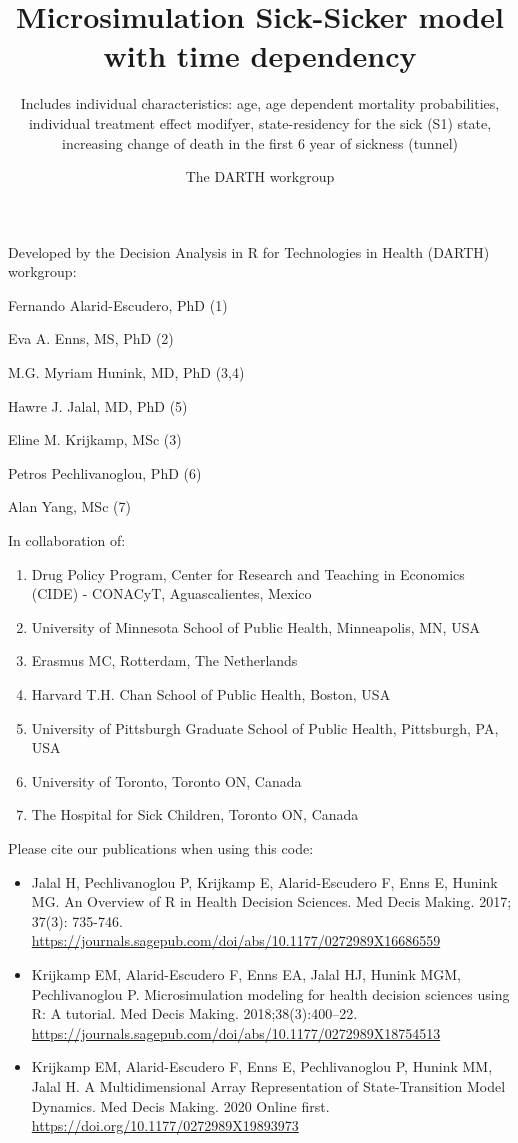 \documentclass[
]{article}
\title{Microsimulation Sick-Sicker model with time dependency}
\subtitle{Includes individual characteristics: age, age dependent mortality
probabilities, individual treatment effect modifyer, state-residency for
the sick (S1) state, increasing change of death in the first 6 year of
sickness (tunnel)}
\author{The DARTH workgroup}
\date{}
\providecommand{\tightlist}{%
  \setlength{\itemsep}{0pt}\setlength{\parskip}{0pt}}
\begin{document}
\maketitle

Developed by the Decision Analysis in R for Technologies in Health
(DARTH) workgroup:

Fernando Alarid-Escudero, PhD (1)

Eva A. Enns, MS, PhD (2)

M.G. Myriam Hunink, MD, PhD (3,4)

Hawre J. Jalal, MD, PhD (5)

Eline M. Krijkamp, MSc (3)

Petros Pechlivanoglou, PhD (6)

Alan Yang, MSc (7)

In collaboration of:

\begin{enumerate}
\def\labelenumi{\arabic{enumi}.}
\tightlist
\item
  Drug Policy Program, Center for Research and Teaching in Economics
  (CIDE) - CONACyT, Aguascalientes, Mexico
\item
  University of Minnesota School of Public Health, Minneapolis, MN, USA
\item
  Erasmus MC, Rotterdam, The Netherlands
\item
  Harvard T.H. Chan School of Public Health, Boston, USA
\item
  University of Pittsburgh Graduate School of Public Health, Pittsburgh,
  PA, USA
\item
  University of Toronto, Toronto ON, Canada
\item
  The Hospital for Sick Children, Toronto ON, Canada
\end{enumerate}

Please cite our publications when using this code:

\begin{itemize}
\item
  Jalal H, Pechlivanoglou P, Krijkamp E, Alarid-Escudero F, Enns E,
  Hunink MG. An Overview of R in Health Decision Sciences. Med Decis
  Making. 2017; 37(3): 735-746.
  \url{https://journals.sagepub.com/doi/abs/10.1177/0272989X16686559}
\item
  Krijkamp EM, Alarid-Escudero F, Enns EA, Jalal HJ, Hunink MGM,
  Pechlivanoglou P. Microsimulation modeling for health decision
  sciences using R: A tutorial. Med Decis Making. 2018;38(3):400--22.
  \url{https://journals.sagepub.com/doi/abs/10.1177/0272989X18754513}
\item
  Krijkamp EM, Alarid-Escudero F, Enns E, Pechlivanoglou P, Hunink MM,
  Jalal H. A Multidimensional Array Representation of State-Transition
  Model Dynamics. Med Decis Making. 2020 Online first.
  \url{https://doi.org/10.1177/0272989X19893973}
\end{itemize}
\end{document}
